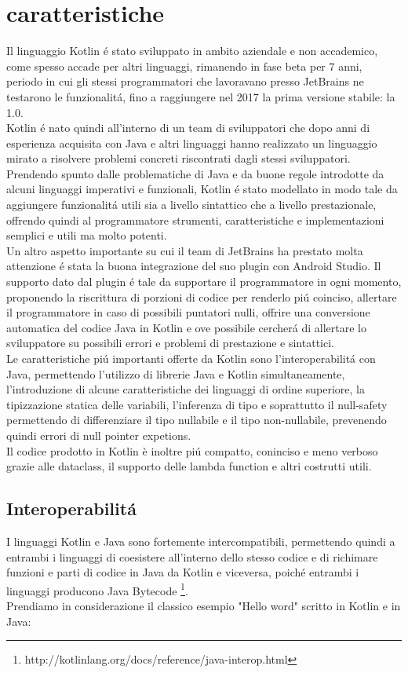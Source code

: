 \section{caratteristiche}
Il linguaggio Kotlin \'e stato sviluppato in ambito aziendale e non accademico, come spesso accade per altri linguaggi, rimanendo in fase beta  per 7 anni, periodo in cui gli stessi programmatori che lavoravano presso JetBrains ne testarono le funzionalit\'a, fino a raggiungere nel 2017 la prima versione stabile: la 1.0. \\
Kotlin \'e nato quindi all'interno di un team di sviluppatori che dopo anni di esperienza acquisita con Java e altri linguaggi hanno realizzato un linguaggio mirato a risolvere problemi concreti riscontrati dagli stessi sviluppatori.\\
Prendendo spunto dalle problematiche di Java e da buone regole introdotte da alcuni linguaggi imperativi e funzionali, Kotlin \'e stato modellato in modo tale da aggiungere funzionalit\'a utili sia a livello sintattico che a livello prestazionale, offrendo quindi al programmatore strumenti, caratteristiche e implementazioni semplici e utili ma molto potenti.\\
Un altro aspetto importante su cui il team di JetBrains ha prestato molta attenzione \'e stata la buona integrazione del suo plugin con Android Studio. Il supporto dato dal plugin \'e tale da supportare il programmatore in ogni momento, proponendo la riscrittura di porzioni di codice per renderlo pi\'u coinciso, allertare il programmatore in caso di possibili puntatori nulli, offrire una conversione automatica del codice Java in Kotlin e ove possibile cercher\'a di allertare lo sviluppatore su possibili errori e problemi di prestazione e sintattici.\\
Le caratteristiche pi\'u importanti offerte da Kotlin sono l'interoperabilit\'a con Java, permettendo l'utilizzo di librerie Java e Kotlin simultaneamente, l'introduzione di alcune caratteristiche dei linguaggi di ordine superiore, la tipizzazione statica delle variabili, l'inferenza di tipo e soprattutto il null-safety permettendo di differenziare il tipo nullabile e il tipo non-nullabile, prevenendo quindi errori di null pointer expetions.\\
Il codice prodotto in Kotlin \`e inoltre pi\'u compatto, coninciso e meno verboso grazie alle dataclass, il supporto delle lambda function e altri costrutti utili.


\subsection{Interoperabilit\'a}
I linguaggi Kotlin e Java sono fortemente intercompatibili, permettendo quindi a entrambi i linguaggi di coesistere all'interno dello stesso codice e di richimare funzioni e parti di codice in Java da Kotlin e viceversa, poich\'e entrambi i linguaggi producono Java Bytecode  \footnote{http://kotlinlang.org/docs/reference/java-interop.html}.\\
Prendiamo in considerazione il classico esempio "Hello word" scritto in Kotlin e in Java:

